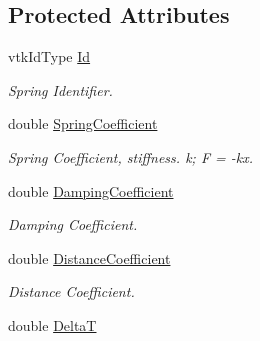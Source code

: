 \subsection*{Protected Attributes}
\begin{DoxyCompactItemize}
\item 
\hypertarget{classvtkSpring_af79ffa0c1d02b73460eb725715ed8d61}{
vtkIdType \hyperlink{classvtkSpring_af79ffa0c1d02b73460eb725715ed8d61}{Id}}
\label{classvtkSpring_af79ffa0c1d02b73460eb725715ed8d61}

\begin{DoxyCompactList}\small\item\em Spring Identifier. \item\end{DoxyCompactList}\item 
\hypertarget{classvtkSpring_a5b828f14ae714a0fd4f77144944a05fc}{
double \hyperlink{classvtkSpring_a5b828f14ae714a0fd4f77144944a05fc}{SpringCoefficient}}
\label{classvtkSpring_a5b828f14ae714a0fd4f77144944a05fc}

\begin{DoxyCompactList}\small\item\em Spring Coefficient, stiffness. k; F = -\/kx. \item\end{DoxyCompactList}\item 
\hypertarget{classvtkSpring_ac7faaa0fc7ba93f3d94e63b555876e66}{
double \hyperlink{classvtkSpring_ac7faaa0fc7ba93f3d94e63b555876e66}{DampingCoefficient}}
\label{classvtkSpring_ac7faaa0fc7ba93f3d94e63b555876e66}

\begin{DoxyCompactList}\small\item\em Damping Coefficient. \item\end{DoxyCompactList}\item 
\hypertarget{classvtkSpring_ac4c0d319a08d06b8ab0a85c241dd5114}{
double \hyperlink{classvtkSpring_ac4c0d319a08d06b8ab0a85c241dd5114}{DistanceCoefficient}}
\label{classvtkSpring_ac4c0d319a08d06b8ab0a85c241dd5114}

\begin{DoxyCompactList}\small\item\em Distance Coefficient. \item\end{DoxyCompactList}\item 
\hypertarget{classvtkSpring_a39fce9a45cadb949ff9b6f6dcff6f106}{
double \hyperlink{classvtkSpring_a39fce9a45cadb949ff9b6f6dcff6f106}{DeltaT}}
\label{classvtkSpring_a39fce9a45cadb949ff9b6f6dcff6f106}


\end{DoxyCompactItemize}
